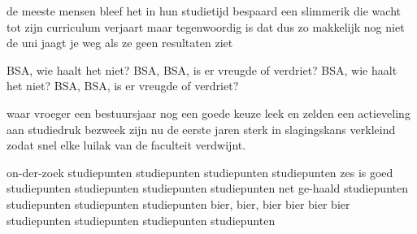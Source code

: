 
\begin{verse*}
de meeste mensen bleef het in hun studietijd bespaard
een slimmerik die wacht tot zijn curriculum verjaart
maar tegenwoordig is dat dus zo makkelijk nog niet
de uni jaagt je weg als ze geen resultaten ziet
\end{verse*}

\begin{chorus}
BSA, wie haalt het niet?
BSA, BSA, is er vreugde of verdriet?
BSA, wie haalt het niet?
BSA, BSA, is er vreugde of verdriet?
\end{chorus}

\begin{verse*}
waar vroeger een bestuursjaar nog een goede keuze leek
en zelden een actieveling aan studiedruk bezweek
zijn nu de eerste jaren sterk in slagingskans verkleind
zodat snel elke luilak van de faculteit verdwijnt.
\end{verse*}

\thechorus

\begin{bridge}
on-der-zoek
studiepunten studiepunten studiepunten studiepunten
zes is goed
studiepunten studiepunten studiepunten studiepunten
net ge-haald
studiepunten studiepunten studiepunten studiepunten
bier, bier,
bier bier bier bier
studiepunten studiepunten studiepunten studiepunten
\end{bridge}

\thechorus
